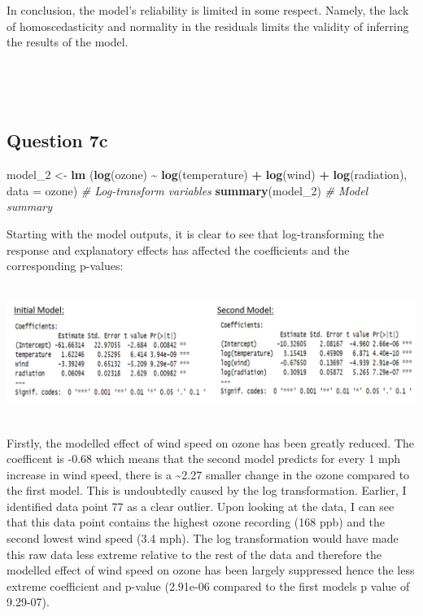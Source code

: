 \documentclass[
]{article}
\newenvironment{Shaded}{\begin{snugshade}}{\end{snugshade}}
\newcommand{\AttributeTok}[1]{\textcolor[rgb]{0.13,0.29,0.53}{#1}}
\newcommand{\CommentTok}[1]{\textcolor[rgb]{0.56,0.35,0.01}{\textit{#1}}}
\newcommand{\FunctionTok}[1]{\textcolor[rgb]{0.13,0.29,0.53}{\textbf{#1}}}
\newcommand{\NormalTok}[1]{#1}
\newcommand{\OtherTok}[1]{\textcolor[rgb]{0.56,0.35,0.01}{#1}}
\newcommand{\SpecialCharTok}[1]{\textcolor[rgb]{0.81,0.36,0.00}{\textbf{#1}}}
\begin{document}
In conclusion, the model's reliability is limited in some respect.
Namely, the lack of homoscedasticity and normality in the residuals
limits the validity of inferring the results of the model.\\
\strut \\
\strut \\

\subsection{Question 7c}\label{question-7c}

\begin{Shaded}
\begin{Highlighting}[]
\NormalTok{model\_2 }\OtherTok{\textless{}{-}} \FunctionTok{lm}\NormalTok{ (}\FunctionTok{log}\NormalTok{(ozone) }\SpecialCharTok{\textasciitilde{}} \FunctionTok{log}\NormalTok{(temperature) }\SpecialCharTok{+} \FunctionTok{log}\NormalTok{(wind) }\SpecialCharTok{+} \FunctionTok{log}\NormalTok{(radiation), }\AttributeTok{data =}\NormalTok{ ozone)  }\CommentTok{\# Log{-}transform variables}
\FunctionTok{summary}\NormalTok{(model\_2) }\CommentTok{\# Model summary}
\end{Highlighting}
\end{Shaded}

Starting with the model outputs, it is clear to see that
log-transforming the response and explanatory effects has affected the
coefficients and the corresponding p-values:\\
\strut \\
\includegraphics{images/coefficients_comparison.png}\\
\strut \\

Firstly, the modelled effect of wind speed on ozone has been greatly
reduced. The coefficent is -0.68 which means that the second model
predicts for every 1 mph increase in wind speed, there is a
\textasciitilde2.27 smaller change in the ozone compared to the first
model. This is undoubtedly caused by the log transformation. Earlier, I
identified data point 77 as a clear outlier. Upon looking at the data, I
can see that this data point contains the highest ozone recording (168
ppb) and the second lowest wind speed (3.4 mph). The log transformation
would have made this raw data less extreme relative to the rest of the
data and therefore the modelled effect of wind speed on ozone has been
largely suppressed hence the less extreme coefficient and p-value
(2.91e-06 compared to the first models p value of 9.29-07).
\end{document}
